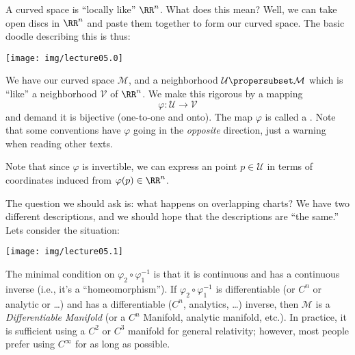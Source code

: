 A curved space is ``locally like'' $\RR^n$. What does this mean?
Well, we can take open discs in $\RR^{n}$ and paste them together
to form our curved space. The basic doodle describing this is
thus:

\begin{center}
  \texttt{[image: img/lecture05.0]}
\end{center}

\noindent\ignorespaces%
We have our curved space $\mathcal{M}$, and a neighborhood
$\mathcal{U}\propersubset\mathcal{M}$ which is ``like'' a
neighborhood $\mathcal{V}$ of $\RR^n$. We make this rigorous by a
mapping
\begin{equation}
\varphi\colon\mathcal{U}\to\mathcal{V}
\end{equation}
and demand it is bijective (one-to-one and onto). The map
$\varphi$ is called a . Note that some
conventions have $\varphi$ going in the \emph{opposite}
direction, just a warning when reading other texts.

Note that since $\varphi$ is invertible, we can express an point
$p\in\mathcal{U}$ in terms of coordinates induced from
$\varphi(p)\in\RR^{n}$. 

The question we should ask is: what happens on overlapping
charts? We have two different descriptions, and we should hope
that the descriptions are ``the same.'' Lets consider the situation:

\begin{center}
  \texttt{[image: img/lecture05.1]}
\end{center}

The minimal condition on $\varphi_{2}\circ\varphi_{1}^{-1}$ is
that it is continuous and has a continuous inverse (i.e., it's a
``homeomorphism''). If $\varphi_{2}\circ\varphi_{1}^{-1}$ is
differentiable (or $C^{n}$ or analytic or \dots) and has a
differentiable ($C^{n}$, analytics, \dots) inverse, then
$\mathcal{M}$ is a \emph{Differentiable Manifold} (or a $C^{n}$
Manifold, analytic manifold, etc.). 
In practice, it is sufficient using a $C^2$ or $C^3$ manifold for
general relativity; however, most people prefer using
$C^{\infty}$ for as long as possible.
